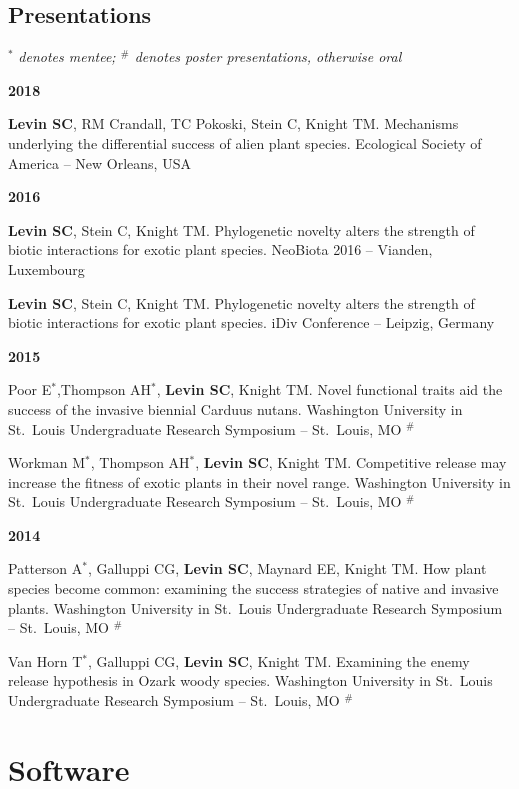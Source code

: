\documentclass[11pt,]{article}
\begin{document}
\hypertarget{presentations}{%
\subsection{Presentations}\label{presentations}}

\(^\ast\) \emph{denotes mentee; \(^\#\) denotes poster presentations,
otherwise oral}

\textbf{2018}

\textbf{Levin SC}, RM Crandall, TC Pokoski, Stein C, Knight TM.
Mechanisms underlying the differential success of alien plant species.
Ecological Society of America -- New Orleans, USA

\textbf{2016}

\textbf{Levin SC}, Stein C, Knight TM. Phylogenetic novelty alters the
strength of biotic interactions for exotic plant species. NeoBiota 2016
-- Vianden, Luxembourg

\textbf{Levin SC}, Stein C, Knight TM. Phylogenetic novelty alters the
strength of biotic interactions for exotic plant species. iDiv
Conference -- Leipzig, Germany

\textbf{2015}

Poor E\(^\ast\),Thompson AH\(^\ast\), \textbf{Levin SC}, Knight TM.
Novel functional traits aid the success of the invasive biennial Carduus
nutans. Washington University in St.~Louis Undergraduate Research
Symposium -- St.~Louis, MO \(^\#\)

Workman M\(^\ast\), Thompson AH\(^\ast\), \textbf{Levin SC}, Knight TM.
Competitive release may increase the fitness of exotic plants in their
novel range. Washington University in St.~Louis Undergraduate Research
Symposium -- St.~Louis, MO \(^\#\)

\textbf{2014}

Patterson A\(^\ast\), Galluppi CG, \textbf{Levin SC}, Maynard EE, Knight
TM. How plant species become common: examining the success strategies of
native and invasive plants. Washington University in St.~Louis
Undergraduate Research Symposium -- St.~Louis, MO \(^\#\)

Van Horn T\(^\ast\), Galluppi CG, \textbf{Levin SC}, Knight TM.
Examining the enemy release hypothesis in Ozark woody species.
Washington University in St.~Louis Undergraduate Research Symposium --
St.~Louis, MO \(^\#\)

\hypertarget{software}{%
\section{Software}\label{software}}
\end{document}
